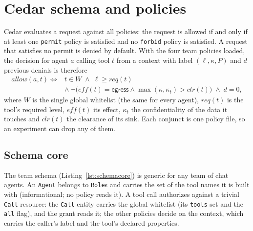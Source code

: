 \documentclass[11pt,a4paper]{article}
\DeclareRobustCommand{\code}[1]{{\renewcommand{\_}{\textunderscore\allowbreak}\texttt{#1}}}
\begin{document}
\section{Cedar schema and policies}
\label{sec:policies}

Cedar evaluates a request against all policies: the request is allowed if and only if
at least one \code{permit} policy is satisfied and no \code{forbid} policy is satisfied.
A request that satisfies no permit is denied by default. With the four team policies
loaded, the decision for agent $a$ calling tool $t$ from a context with label
$(\ell, \kappa, P)$ and $d$ previous denials is therefore
\begin{equation}
\begin{aligned}
\mathit{allow}(a, t) \iff{}&
  t \in W
  \;\wedge\; \ell \geq \mathit{req}(t)\\
  &\wedge\; \neg\bigl(\mathit{eff}(t) = \mathsf{egress} \wedge \max(\kappa, \kappa_t) > \mathit{clr}(t)\bigr)
  \;\wedge\; d = 0,
\end{aligned}
  \label{eq:allow}
\end{equation}
where $W$ is the single global whitelist (the same for every agent),
$\mathit{req}(t)$ is the tool's required level, $\mathit{eff}(t)$ its effect,
$\kappa_t$ the confidentiality of the data it touches and $\mathit{clr}(t)$ the clearance
of its sink. Each conjunct is one policy file, so an experiment can drop any of them.

\subsection{Schema core}
\label{sec:schemacore}

The team schema (Listing~\ref{lst:schemacore}) is generic for any team of chat agents.
An \code{Agent} belongs to \code{Role}s and carries the set of the tool names it is built
with (informational; no policy reads it). A tool call authorizes against a trivial
\code{Call} resource: the \code{Call} entity carries the global whitelist (its \code{tools}
set and the \code{all} flag), and the grant reads it; the other policies decide on the
context, which carries the caller's label and the tool's declared properties.
\end{document}
